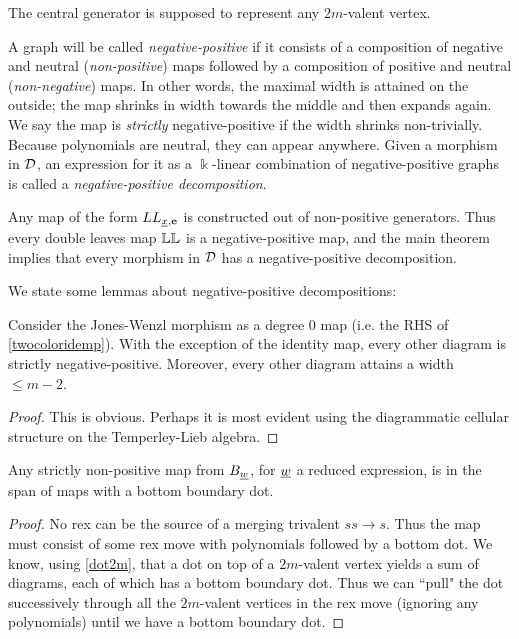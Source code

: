 
The central generator is supposed to represent any $2m$-valent vertex.

A graph will be called \emph{negative-positive} if it consists of a composition of negative and neutral (\emph{non-positive}) maps followed by a composition of positive and neutral
(\emph{non-negative}) maps. In other words, the maximal width is attained on the outside; the map shrinks in width towards the middle and then expands again. We say the map is
\emph{strictly} negative-positive if the width shrinks non-trivially. Because polynomials are neutral, they can appear anywhere. Given a morphism in ${\mathcal{D}}$, an expression for it as a
$\Bbbk$-linear combination of negative-positive graphs is called a \emph{negative-positive decomposition}.

Any map of the form $LL_{{\underline{x}},{\mathbf e}}$ is constructed out of non-positive generators. Thus every double leaves map $\mathbb{LL}$ is a negative-positive map, and the main theorem implies that every morphism in ${\mathcal{D}}$ has a negative-positive decomposition.

We state some lemmas about negative-positive decompositions:

\begin{claim} Consider the Jones-Wenzl morphism as a degree $0$ map (i.e. the RHS of \eqref{twocoloridemp}). With the exception of the identity map, every other diagram is strictly
negative-positive. Moreover, every other diagram attains a width $\le m-2$. \end{claim}

\begin{proof} This is obvious. Perhaps it is most evident using the diagrammatic cellular structure on the Temperley-Lieb algebra. \end{proof}

\begin{claim} Any strictly non-positive map from $B_{\underline{w}}$, for ${\underline{w}}$ a reduced expression, is in the span of maps with a bottom boundary dot. \label{posrexhasdot} \end{claim}

\begin{proof} No rex can be the source of a merging trivalent $ss \to s$. Thus the map must consist of some rex move with polynomials followed by a bottom dot. We know,
using \eqref{dot2m}, that a dot on top of a $2m$-valent vertex yields a sum of diagrams, each of which has a bottom boundary dot. Thus we can ``pull" the dot successively through all the
$2m$-valent vertices in the rex move (ignoring any polynomials) until we have a bottom boundary dot. \end{proof}

